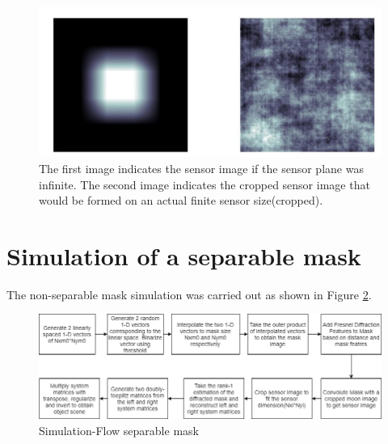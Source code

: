 \begin{figure}[ht]
\includegraphics[scale = 0.50]{pics/sensorCropped}
\caption{The first image indicates the sensor image if the sensor plane was infinite. The second image indicates the cropped sensor image that would be formed on an actual finite sensor size(cropped).}
\label{fig:moon_image}
\end{figure}


\section{Simulation of a separable mask}
The non-separable mask simulation was carried out as shown in Figure \ref{fig:sep_sim}.
\begin{figure}[ht]
\includegraphics[scale = 0.50]{pics/sep_mask_sim_flow}
\caption{Simulation-Flow separable mask}
\label{fig:sep_sim}
\end{figure}


